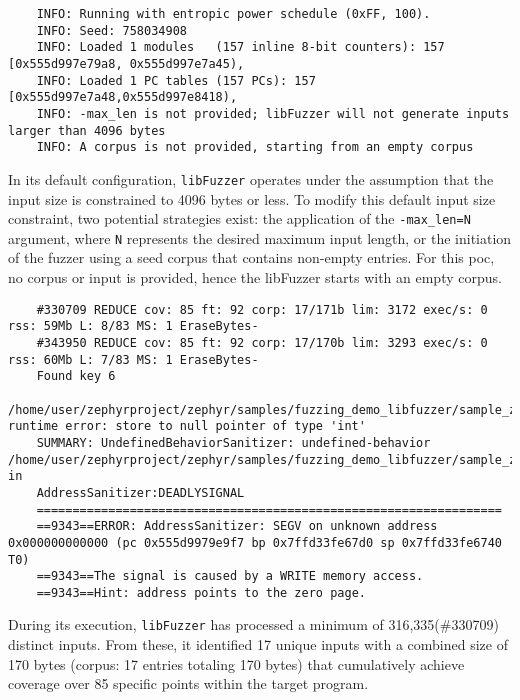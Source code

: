 \begin{verbatim}
    INFO: Running with entropic power schedule (0xFF, 100).
    INFO: Seed: 758034908
    INFO: Loaded 1 modules   (157 inline 8-bit counters): 157 [0x555d997e79a8, 0x555d997e7a45),
    INFO: Loaded 1 PC tables (157 PCs): 157 [0x555d997e7a48,0x555d997e8418),
    INFO: -max_len is not provided; libFuzzer will not generate inputs larger than 4096 bytes
    INFO: A corpus is not provided, starting from an empty corpus
\end{verbatim}

In its default configuration, \texttt{libFuzzer} operates under
the assumption that the input size is constrained to 4096 bytes or less.
To modify this default input size constraint, two potential strategies exist:
the application of the \texttt{-max\_len=N} argument, where \texttt{N} represents
the desired maximum input length, or the initiation of the fuzzer using a
seed corpus that contains non-empty entries. For this \acrlong{poc},
no corpus or input is provided, hence the libFuzzer starts with an empty corpus.

\begin{verbatim}
    #330709 REDUCE cov: 85 ft: 92 corp: 17/171b lim: 3172 exec/s: 0 rss: 59Mb L: 8/83 MS: 1 EraseBytes-
    #343950 REDUCE cov: 85 ft: 92 corp: 17/170b lim: 3293 exec/s: 0 rss: 60Mb L: 7/83 MS: 1 EraseBytes-
    Found key 6
    /home/user/zephyrproject/zephyr/samples/fuzzing_demo_libfuzzer/sample_zephyr_libfuzzer/src/main.c:52:1: runtime error: store to null pointer of type 'int'
    SUMMARY: UndefinedBehaviorSanitizer: undefined-behavior /home/user/zephyrproject/zephyr/samples/fuzzing_demo_libfuzzer/sample_zephyr_libfuzzer/src/main.c:52:1 in
    AddressSanitizer:DEADLYSIGNAL
    =================================================================
    ==9343==ERROR: AddressSanitizer: SEGV on unknown address 0x000000000000 (pc 0x555d9979e9f7 bp 0x7ffd33fe67d0 sp 0x7ffd33fe6740 T0)
    ==9343==The signal is caused by a WRITE memory access.
    ==9343==Hint: address points to the zero page.
\end{verbatim}

During its execution, \texttt{libFuzzer} has processed a minimum of
316,335(\#330709) distinct inputs. From these, it identified 17 unique
inputs with a combined size of 170 bytes (corpus: 17 entries totaling 170 bytes)
that cumulatively achieve coverage over 85 specific points within the target program.

